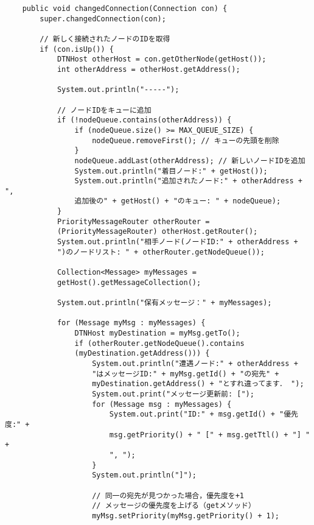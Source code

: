 \documentclass[11pt]{icsthesis}
\begin{document}
\begin{framed}
\begin{verbatim}
    public void changedConnection(Connection con) {
        super.changedConnection(con);
        
        // 新しく接続されたノードのIDを取得
        if (con.isUp()) {
            DTNHost otherHost = con.getOtherNode(getHost());
            int otherAddress = otherHost.getAddress();
            
            System.out.println("-----");
            
            // ノードIDをキューに追加
            if (!nodeQueue.contains(otherAddress)) {
                if (nodeQueue.size() >= MAX_QUEUE_SIZE) {
                    nodeQueue.removeFirst(); // キューの先頭を削除
                }
                nodeQueue.addLast(otherAddress); // 新しいノードIDを追加
                System.out.println("着目ノード:" + getHost());
                System.out.println("追加されたノード:" + otherAddress + ", 
                追加後の" + getHost() + "のキュー: " + nodeQueue);
            }
            PriorityMessageRouter otherRouter = 
            (PriorityMessageRouter) otherHost.getRouter();
            System.out.println("相手ノード(ノードID:" + otherAddress + 
            ")のノードリスト: " + otherRouter.getNodeQueue());
      
            Collection<Message> myMessages = 
            getHost().getMessageCollection();
            
            System.out.println("保有メッセージ：" + myMessages);

            for (Message myMsg : myMessages) {
                DTNHost myDestination = myMsg.getTo();
                if (otherRouter.getNodeQueue().contains
                (myDestination.getAddress())) {
                    System.out.println("遭遇ノード:" + otherAddress + 
                    "はメッセージID:" + myMsg.getId() + "の宛先" + 
                    myDestination.getAddress() + "とすれ違ってます． ");
                    System.out.print("メッセージ更新前: [");
                    for (Message msg : myMessages) {
                        System.out.print("ID:" + msg.getId() + "優先度:" + 
                        msg.getPriority() + " [" + msg.getTtl() + "] " + 
                        ", ");
                    }
                    System.out.println("]");

                    // 同一の宛先が見つかった場合，優先度を+1
                    // メッセージの優先度を上げる（getメソッド）
                    myMsg.setPriority(myMsg.getPriority() + 1);
                    

\end{verbatim}
\end{framed}
\end{document}
